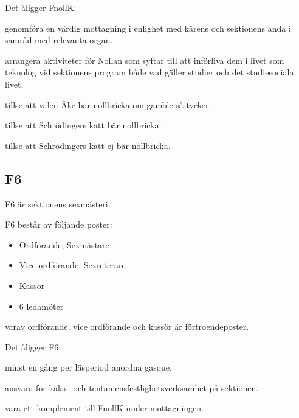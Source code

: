 \documentclass{styrdokument}
\begin{document}
\? Det åligger FnollK:
\begin{aligganden}
    \item genomföra en värdig mottagning i enlighet med kårens och sektionens anda i samråd med relevanta organ.
    \item arrangera aktiviteter för Nollan som syftar till att införliva dem i livet som teknolog vid sektionens program både vad gäller studier och det studiesociala livet.
    \item tillse att valen Åke bär nollbricka om gamble så tycker.
    \item tillse att Schrödingers katt bär nollbricka.
    \item tillse att Schrödingers katt ej bär nollbricka.
\end{aligganden}


\subsection{F6}
\? F6 är sektionens sexmästeri.

\? F6 består av följande poster:
\begin{itemize}
	\item Ordförande, Sexmästare
	\item Vice ordförande, Sexreterare
	\item Kassör
	\item 6 ledamöter
\end{itemize}
varav ordförande, vice ordförande och kassör är förtroendeposter.

\? Det åligger F6:
\begin{aligganden}
    \item minst en gång per läsperiod anordna gasque.
    \item ansvara för kalas- och tentamensfestlighetsverksamhet på sektionen.
    \item vara ett komplement till FnollK under mottagningen.
\end{aligganden}

\end{document}
